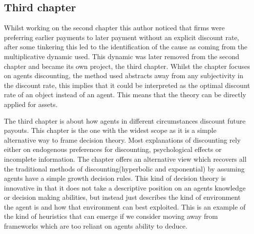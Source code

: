 \documentclass[12pt]{article}
\numberwithin{equation}{section}
\begin{document}
 \subsection{Third chapter}

Whilst working on the second chapter this author noticed that firms were preferring earlier payments to later payment without an explicit discount rate, after some tinkering this led to the identification of the cause as coming from the multiplicative dynamic used. This dynamic was later removed from the second chapter and became its own project, the third chapter. Whilst the chapter focuses on agents discounting, the method used abstracts away from any subjectivity in the discount rate, this implies that it could be interpreted as the optimal discount rate of an object instead of an agent. This means that the theory can be directly applied for assets.  

The third chapter is about how agents in different circumstances discount future payouts. This chapter is the one with the widest scope as it is a simple alternative way to frame decision theory. Most explanations of discounting rely either on endogenous preferences for discounting, psychological effects or incomplete information. The chapter offers an alternative view which recovers all the traditional methods of discounting(hyperbolic and exponential) by assuming agents have a simple growth decision rules. This kind of decision theory is innovative in that it does not take a descriptive position on an agents knowledge or decision making abilities, but instead just describes the kind of environment the agent is and how that environment can best exploited. This is an example of the kind of heuristics that can emerge if we consider moving away from frameworks which are too reliant on agents ability to deduce.





\end{document}
